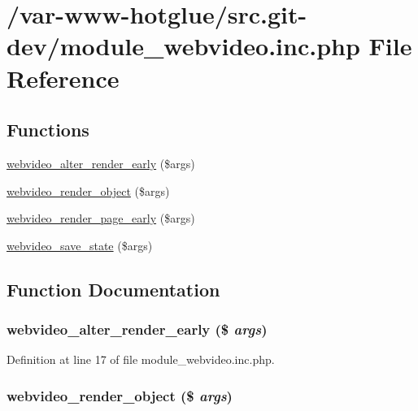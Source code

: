 \hypertarget{module__webvideo_8inc_8php}{
\section{/var-\/www-\/hotglue/src.git-\/dev/module\_\-webvideo.inc.php File Reference}
\label{module__webvideo_8inc_8php}
}
\subsection*{Functions}
\begin{DoxyCompactItemize}
\item 
\hyperlink{module__webvideo_8inc_8php_ac80ed52a5c0c172ceed781db379b5a90}{webvideo\_\-alter\_\-render\_\-early} (\$args)
\item 
\hyperlink{module__webvideo_8inc_8php_aeb27081a684b517b2b6dea26b8a2c905}{webvideo\_\-render\_\-object} (\$args)
\item 
\hyperlink{module__webvideo_8inc_8php_a347f107ab60e260a4fa7807291c67867}{webvideo\_\-render\_\-page\_\-early} (\$args)
\item 
\hyperlink{module__webvideo_8inc_8php_ab1ecc6e1e1827b95191ee72f4cddef3d}{webvideo\_\-save\_\-state} (\$args)
\end{DoxyCompactItemize}


\subsection{Function Documentation}
\hypertarget{module__webvideo_8inc_8php_ac80ed52a5c0c172ceed781db379b5a90}{
\subsubsection[{webvideo\_\-alter\_\-render\_\-early}]{\setlength{\rightskip}{0pt plus 5cm}webvideo\_\-alter\_\-render\_\-early (\$ {\em args})}}
\label{module__webvideo_8inc_8php_ac80ed52a5c0c172ceed781db379b5a90}


Definition at line 17 of file module\_\-webvideo.inc.php.

\hypertarget{module__webvideo_8inc_8php_aeb27081a684b517b2b6dea26b8a2c905}{
\subsubsection[{webvideo\_\-render\_\-object}]{\setlength{\rightskip}{0pt plus 5cm}webvideo\_\-render\_\-object (\$ {\em args})}}
\label{module__webvideo_8inc_8php_aeb27081a684b517b2b6dea26b8a2c905}


